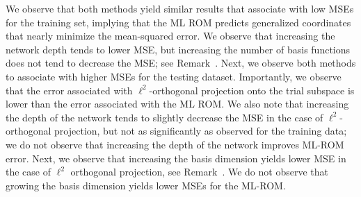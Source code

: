 \documentclass[3p,computermodern,10pt]{elsarticle}
\begin{document}
We observe that both methods yield similar results that associate with low MSEs for the training set, implying that the ML ROM predicts generalized coordinates that nearly minimize the mean-squared error. We observe that increasing the network depth tends to lower MSE, but increasing the number of basis functions does not tend to decrease the MSE; see Remark~\cite{}. Next, we observe both methods to associate with higher MSEs for the testing dataset. Importantly, we observe that the error associated with $\ell^2$-orthogonal projection onto the trial subspace is lower than the error associated with the ML ROM. We also note that increasing the depth of the network tends to slightly decrease the MSE in the case of $\ell^2$-orthogonal projection, but not as significantly as observed for the training data; we do not observe that increasing the depth of the network improves ML-ROM error. Next, we observe that increasing the basis dimension yields lower MSE in the case of $\ell^2$ orthogonal projection, see Remark~\cite{}. We do not observe that growing the basis dimension yields lower MSEs for the ML-ROM.    
\end{document}
